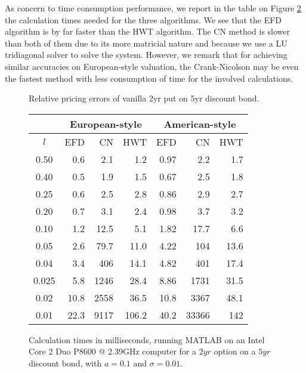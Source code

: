 As concern to time consumption performance, we report in the table on
Figure \ref{TimePuts} the calculation times needed for the three
algorithms. We see that the EFD algorithm is by far faster than the HWT
algorithm. The CN method is slower than both of them due to its more
matricial nature and because we use a LU tridiagonal solver to solve the
system. However, we remark that for achieving similar accuracies on
European-style valuation, the Crank-Nicolson may be even the fastest
method with less consumption of time for the involved calculations.
\begin{figure}[h!]
\centering
\caption{Relative pricing errors of vanilla 2yr put on 5yr discount
  bond.\label{EuropeanPuts}}
\end{figure}

\begin{figure}[h!]
\caption{Calculation times in milliseconds, running MATLAB on an Intel
  Core 2 Duo P8600 @ 2.39GHz computer for a $2yr$ option on a $5yr$
  discount bond, with $a=0.1$ and $\sigma=0.01$.\label{TimePuts}} 
\begin{center}
\begin{tabular}{|c|rrr|rrr|}
\hline\hline
& \multicolumn{3}{|c|}{European-style} &
\multicolumn{3}{|c|}{American-style} \\ 
\hline
$l$ & EFD & CN & HWT & EFD & CN & HWT  \\
\hline 
 0.50 & 0.6 & 2.1 & 1.2  &0.97&  2.2 & 1.7 \\
 0.40 & 0.5 & 1.9 & 1.5  &0.67&  2.5 & 1.8 \\
 0.25 & 0.6 & 2.5 & 2.8  &0.86&  2.9 & 2.7 \\
 0.20 & 0.7 & 3.1 & 2.4  &0.98&  3.7 & 3.2 \\
 0.10 & 1.2 & 12.5& 5.1  &1.82&  17.7& 6.6 \\
 0.05 & 2.6 & 79.7& 11.0 &4.22&  104 & 13.6 \\
 0.04 & 3.4 & 406 & 14.1 &4.82&  401 & 17.4 \\
 0.025& 5.8 & 1246& 28.4 &8.86&  1731& 31.5 \\
 0.02 & 10.8& 2558& 36.5 &10.8&  3367& 48.1 \\
 0.01 & 22.3& 9117& 106.2&40.2& 33366& 142 \\
\hline
\end{tabular}
\end{center}
\end{figure}

